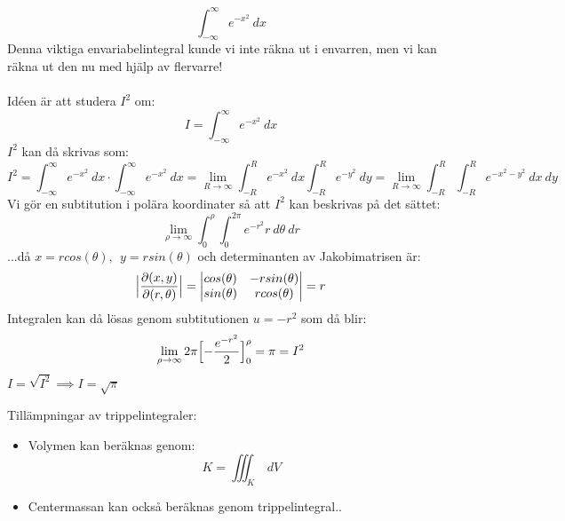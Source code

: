 \documentclass{report}
\begin{document}
{
\begin{equation*}
	\int_{- \infty}^{ \infty} e^{-x^2} \: dx 
\end{equation*}
Denna viktiga envariabelintegral kunde vi inte räkna ut i envarren, men vi kan räkna ut den nu med hjälp av flervarre!\\\\

Idéen är att studera $ I^2 $ om:
\begin{equation*}
	I = \int_{- \infty}^{ \infty} e^{-x^2} \: dx 
\end{equation*}
$ I^2 $ kan då skrivas som:
\begin{equation*}
	I^2 = \int_{- \infty}^{ \infty} e^{-x^2} \: dx \cdot \int_{- \infty}^{ \infty} e^{-x^2} \: dx = \lim_{R \to \infty} \int_{-R}^{R} e^{-x^2} \: dx \int_{-R}^{R} e^{-y^2} \: dy = \lim_{R \to \infty} \int_{-R}^{R} \int_{-R}^{R} e^{-x^2-y^2} \: dx  \: dy     
\end{equation*}
Vi gör en subtitution i polära koordinater så att $ I^2 $ kan beskrivas på det sättet:
\begin{equation*}
	\lim_{\rho \to \infty} \int_{0}^{\rho} \int_{0}^{2 \pi} e^{-r^2} r \: d\theta  \: dr 
\end{equation*}
...då $ x = r cos(\theta),\:\: y = r sin(\theta) $ och determinanten av Jakobimatrisen är:
\begin{equation*}
\Bigl| \frac{\partial(x,y)}{\partial(r,\theta)}   \Bigr| =
\begin{vmatrix}
	cos(\theta) & -r sin(\theta) \\
	sin(\theta) & r cos(\theta) \\
\end{vmatrix}
= r
\end{equation*}
Integralen kan då lösas genom subtitutionen $ u = -r^2 $ som då blir:
\begin{equation*}
	\lim_{\rho \to \infty} 2\pi \Bigl[ - \frac{e^{-r^2}}{2}   \Bigr]_{0}^{\rho} = \pi = I^2
\end{equation*}
$ I = \sqrt{I^2} \implies I = \sqrt{\pi}  $ 
}

\noindent
Tillämpningar av trippelintegraler:
\begin{itemize}
	\item Volymen kan beräknas genom:
	\begin{equation*}
	K = \iiint_{K}  \: dV 
	\end{equation*}
\item Centermassan kan också beräknas genom trippelintegral..
\end{itemize}
\end{document}
